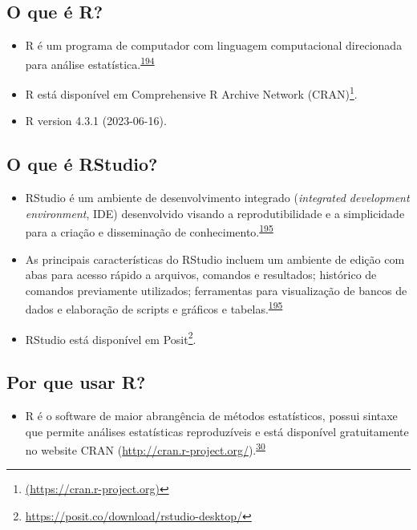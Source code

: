 \documentclass[
  a4paper,
]{book}
\providecommand{\tightlist}{%
  \setlength{\itemsep}{0pt}\setlength{\parskip}{0pt}}
\renewcommand{\href}[2]{#2\footnote{\url{#1}}}
\begin{document}
\hypertarget{o-que-uxe9-r}{%
\subsection{O que é R?}\label{o-que-uxe9-r}}

\begin{itemize}
\item
  R é um programa de computador com linguagem computacional direcionada para análise estatística.\textsuperscript{\protect\hyperlink{ref-ihaka1996}{194}}
\item
  R está disponível em \href{(https://cran.r-project.org)}{Comprehensive R Archive Network (CRAN)}.
\item
  R version 4.3.1 (2023-06-16).
\end{itemize}

\hypertarget{o-que-uxe9-rstudio}{%
\subsection{O que é RStudio?}\label{o-que-uxe9-rstudio}}

\begin{itemize}
\item
  RStudio é um ambiente de desenvolvimento integrado (\emph{integrated development environment}, IDE) desenvolvido visando a reprodutibilidade e a simplicidade para a criação e disseminação de conhecimento.\textsuperscript{\protect\hyperlink{ref-racine2011}{195}}
\item
  As principais características do RStudio incluem um ambiente de edição com abas para acesso rápido a arquivos, comandos e resultados; histórico de comandos previamente utilizados; ferramentas para visualização de bancos de dados e elaboração de scripts e gráficos e tabelas.\textsuperscript{\protect\hyperlink{ref-racine2011}{195}}
\item
  RStudio está disponível em \href{https://posit.co/download/rstudio-desktop/}{Posit}.
\end{itemize}

\hypertarget{por-que-usar-r}{%
\subsection{Por que usar R?}\label{por-que-usar-r}}

\begin{itemize}
\tightlist
\item
  R é o software de maior abrangência de métodos estatísticos, possui sintaxe que permite análises estatísticas reproduzíveis e está disponível gratuitamente no website CRAN (\url{http://cran.r-project.org/}).\textsuperscript{\protect\hyperlink{ref-mair2016}{30}}
\end{itemize}
\end{document}

